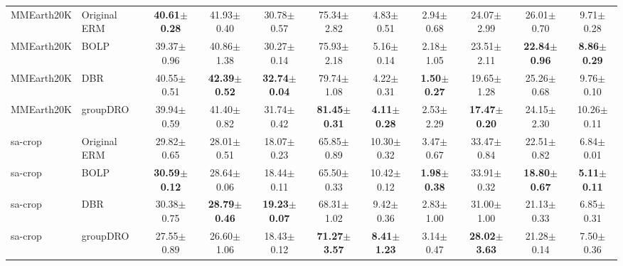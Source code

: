 \documentclass[11pt]{article}
\begin{document}
\begin{table}[h!]
{\begin{tabular}{llccccccccc}
MMEarth20K & Original ERM & \textbf{40.61$\pm$0.28} & 41.93$\pm$0.40 & 30.78$\pm$0.57 & 75.34$\pm$2.82 & 4.83$\pm$0.51 & 2.94$\pm$0.68 & 24.07$\pm$2.99 & 26.01$\pm$0.70 & 9.71$\pm$0.28 \\
MMEarth20K & BOLP & 39.37$\pm$0.96 & 40.86$\pm$1.38 & 30.27$\pm$0.14 & 75.93$\pm$2.18 & 5.16$\pm$0.14 & 2.18$\pm$1.05 & 23.51$\pm$2.11 & \textbf{22.84$\pm$0.96} & \textbf{8.86$\pm$0.29} \\
MMEarth20K & DBR & 40.55$\pm$0.51 & \textbf{42.39$\pm$0.52} & \textbf{32.74$\pm$0.04} & 79.74$\pm$1.08 & 4.22$\pm$0.31 & \textbf{1.50$\pm$0.27} & 19.65$\pm$1.28 & 25.26$\pm$0.68 & 9.76$\pm$0.10 \\
MMEarth20K & groupDRO & 39.94$\pm$0.59 & 41.40$\pm$0.82 & 31.74$\pm$0.42 & \textbf{81.45$\pm$0.31} & \textbf{4.11$\pm$0.28} & 2.53$\pm$2.29 & \textbf{17.47$\pm$0.20} & 24.15$\pm$2.30 & 10.26$\pm$0.11 \\
\midrule

sa-crop & Original ERM & 29.82$\pm$0.65 & 28.01$\pm$0.51 & 18.07$\pm$0.23 & 65.85$\pm$0.89 & 10.30$\pm$0.32 & 3.47$\pm$0.67 & 33.47$\pm$0.84 & 22.51$\pm$0.82 & 6.84$\pm$0.01 \\
sa-crop & BOLP & \textbf{30.59$\pm$0.12} & 28.64$\pm$0.06 & 18.44$\pm$0.11 & 65.50$\pm$0.33 & 10.42$\pm$0.12 & \textbf{1.98$\pm$0.38} & 33.91$\pm$0.32 & \textbf{18.80$\pm$0.67} & \textbf{5.11$\pm$0.11} \\
sa-crop & DBR & 30.38$\pm$0.75 & \textbf{28.79$\pm$0.46} & \textbf{19.23$\pm$0.07} & 68.31$\pm$1.02 & 9.42$\pm$0.36 & 2.83$\pm$1.00 & 31.00$\pm$1.00 & 21.13$\pm$0.33 & 6.85$\pm$0.31 \\
sa-crop & groupDRO & 27.55$\pm$0.89 & 26.60$\pm$1.06 & 18.43$\pm$0.12 & \textbf{71.27$\pm$3.57} & \textbf{8.41$\pm$1.23} & 3.14$\pm$0.47 & \textbf{28.02$\pm$3.63} & 21.28$\pm$0.14 & 7.50$\pm$0.36 \\
\bottomrule
\end{tabular}%
}
\end{table}



\end{document}
